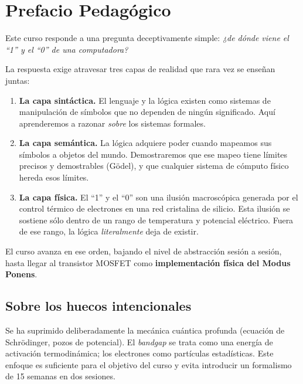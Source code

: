 \documentclass[11pt, letterpaper]{article}
\begin{document}
\tableofcontents
\newpage

\section*{Prefacio Pedagógico}

Este curso responde a una pregunta deceptivamente simple: \emph{¿de dónde viene el ``1'' y el ``0'' de una computadora?}

La respuesta exige atravesar tres capas de realidad que rara vez se enseñan juntas:

\begin{enumerate}
  \item \textbf{La capa sintáctica.} El lenguaje y la lógica existen como sistemas de manipulación de símbolos que no dependen de ningún significado. Aquí aprenderemos a razonar \emph{sobre} los sistemas formales.

  \item \textbf{La capa semántica.} La lógica adquiere poder cuando mapeamos sus símbolos a objetos del mundo. Demostraremos que ese mapeo tiene límites precisos y demostrables (Gödel), y que cualquier sistema de cómputo físico hereda esos límites.

  \item \textbf{La capa física.} El ``1'' y el ``0'' son una ilusión macroscópica generada por el control térmico de electrones en una red cristalina de silicio. Esta ilusión se sostiene sólo dentro de un rango de temperatura y potencial eléctrico. Fuera de ese rango, la lógica \emph{literalmente} deja de existir.
\end{enumerate}

El curso avanza en ese orden, bajando el nivel de abstracción sesión a sesión, hasta llegar al transistor MOSFET como \textbf{implementación física del Modus Ponens}.

\subsection*{Sobre los huecos intencionales}
Se ha suprimido deliberadamente la mecánica cuántica profunda (ecuación de Schrödinger, pozos de potencial). El \emph{bandgap} se trata como una energía de activación termodinámica; los electrones como partículas estadísticas. Este enfoque es suficiente para el objetivo del curso y evita introducir un formalismo de 15 semanas en dos sesiones.
\end{document}
